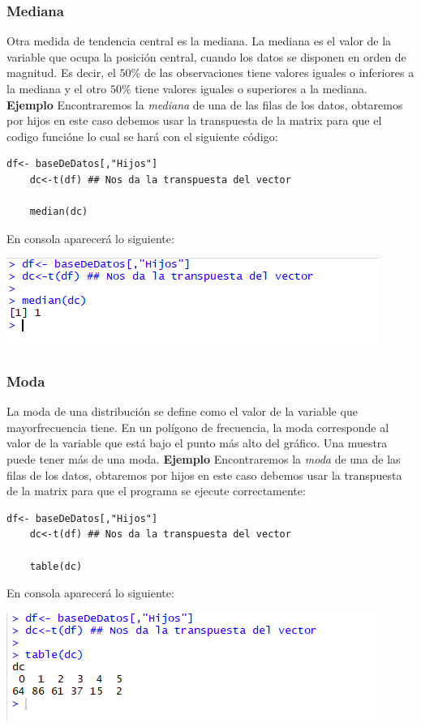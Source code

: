 \documentclass[12pt,hidelinks]{article}
\begin{document}
	\subsubsection{Mediana}
	Otra medida de tendencia central es la mediana. La mediana es el valor de la variable que ocupa la posición central, cuando los datos se disponen en orden de magnitud. Es decir, el $50\%$ de las observaciones tiene valores iguales o inferiores a la mediana y el otro $50\%$ tiene valores iguales o superiores a la mediana. \textbf{Ejemplo} Encontraremos la \textit{mediana} de una de las filas de los datos, obtaremos por hijos  en este caso debemos usar la transpuesta de la matrix para que el codigo funcióne lo cual se hará con el siguiente código:
	\begin{lstlisting}[frame=single]
	df<- baseDeDatos[,"Hijos"]
	dc<-t(df) ## Nos da la transpuesta del vector
	
	median(dc)
	\end{lstlisting}
	En consola aparecerá lo siguiente:
	\begin{center}
		\includegraphics[]{images/2/Mediana.PNG}
	\end{center}
	\subsubsection{Moda}
	La moda de una distribución se define como el valor de la variable que mayorfrecuencia tiene. En un polígono de frecuencia, la moda corresponde al valor de la variable que está bajo el punto más alto del gráfico. Una muestra puede tener más de una moda. \textbf{Ejemplo} Encontraremos la \textit{moda} de una de las filas de los datos, obtaremos por hijos en este caso debemos usar la transpuesta de la matrix para que el programa se ejecute correctamente:
	\begin{lstlisting}[frame=single]
	df<- baseDeDatos[,"Hijos"]
	dc<-t(df) ## Nos da la transpuesta del vector
	
	table(dc)
	\end{lstlisting}
	En consola aparecerá lo siguiente:
	\begin{center}
		\includegraphics[]{images/2/Moda.PNG}
	\end{center}
\end{document}
